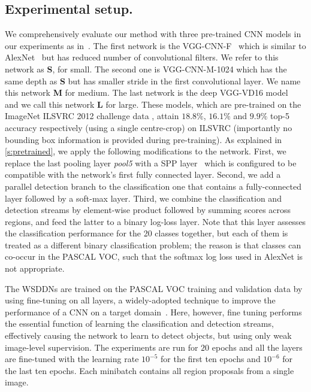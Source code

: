 \documentclass[10pt,twocolumn,letterpaper]{article}
\begin{document}
\subsection{Experimental setup.}\label{subsec:expsetup}
We comprehensively evaluate our method with three pre-trained CNN models in our experiments as in~\cite{Girshick15}. The first network is the VGG-CNN-F~\cite{Chatfield14} which is similar to AlexNet~\cite{Krizhevsky12} but has reduced number of convolutional filters. We refer to this network as \textbf{S}, for small. The second one is VGG-CNN-M-1024 which has the same depth as \textbf{S} but has smaller stride in the first convolutional layer. We name this network \textbf{M} for medium. The last network is the deep VGG-VD16 model~\cite{Simonyan15} and we call this network \textbf{L} for large. These models, which are pre-trained on the ImageNet ILSVRC 2012 challenge data \cite{Russakovsky15}, attain  $18.8 \%$, $16.1 \%$ and $9.9 \%$ top-5 accuracy respectively (using a single centre-crop) on ILSVRC (importantly no bounding box information is provided during pre-training). As explained in \cref{s:pretrained}, we apply the following modifications to the network. First, we replace the last pooling layer \textit{pool5} with a SPP layer~\cite{He14} which is configured to be compatible with the network's first fully connected layer. Second, we add a parallel detection branch to the classification one that contains a fully-connected layer followed by a soft-max layer. Third, we combine the classification and detection streams by element-wise product followed by summing scores across regions, and feed the latter to a binary log-loss layer. Note that this layer assesses the classification performance for the 20 classes together, but each of them is treated as a different binary classification problem; the reason is that classes can co-occur in the PASCAL VOC, such that the softmax log loss used in AlexNet is not appropriate.

The WSDDNs are trained on the PASCAL VOC training and validation data by using fine-tuning on all layers, a widely-adopted technique to improve the performance of a CNN on a target domain~\cite{Chatfield14}. Here, however, fine tuning performs the essential function of learning the classification and detection streams, effectively causing the network to learn to detect objects, but using only weak image-level supervision. The experiments are run for $20$ epochs and all the layers are fine-tuned with the learning rate $10^{-5}$ for the first ten epochs and $10^{-6}$ for the last ten epochs. Each minibatch contains all region proposals from a single image.
\end{document}
